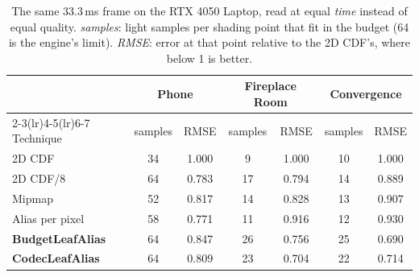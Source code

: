 \begin{table}[H]
\centering\small
\setlength{\tabcolsep}{5pt}
\caption{The same 33.3\,ms frame on the RTX 4050 Laptop, read at equal \emph{time} instead of equal quality. \emph{samples}: light samples per shading point that fit in the budget (64 is the engine's limit). \emph{RMSE}: error at that point relative to the 2D CDF's, where below 1 is better.}
\label{tab:op}
\begin{tabular}{l cc cc cc}
\toprule
 & \multicolumn{2}{c}{Phone} & \multicolumn{2}{c}{Fireplace Room} & \multicolumn{2}{c}{Convergence} \\
\cmidrule(lr){2-3}\cmidrule(lr){4-5}\cmidrule(lr){6-7}
Technique & samples & RMSE & samples & RMSE & samples & RMSE \\
\midrule
2D CDF & 34 & 1.000 & 9 & 1.000 & 10 & 1.000 \\
2D CDF/8 & 64 & 0.783 & 17 & 0.794 & 14 & 0.889 \\
Mipmap & 52 & 0.817 & 14 & 0.828 & 13 & 0.907 \\
Alias per pixel & 58 & 0.771 & 11 & 0.916 & 12 & 0.930 \\
\textbf{BudgetLeafAlias} & 64 & 0.847 & 26 & 0.756 & 25 & 0.690 \\
\textbf{CodecLeafAlias} & 64 & 0.809 & 23 & 0.704 & 22 & 0.714 \\
\bottomrule
\end{tabular}
\end{table}
